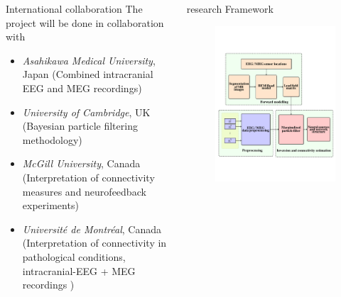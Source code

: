\documentclass[serif,final]{beamer}
\begin{document}
\begin{frame}{}
\begin{columns}[t]
\begin{column}{0.45\linewidth}
	\begin{block}{International collaboration}
        The project will be done in collaboration with 
        \begin{itemize}
    		    \small
        		\item \textit{Asahikawa Medical University}, Japan (Combined intracranial EEG and MEG recordings)
	        \item \textit{University of Cambridge}, UK (Bayesian particle filtering methodology)
    		    \item \textit{McGill University}, Canada (Interpretation of connectivity measures and neurofeedback experiments)
    		    \item  \textit{Universit\'e de Montr\'eal}, Canada (Interpretation of connectivity in pathological conditions, intracranial-EEG + MEG recordings )
        \end{itemize}      
    \end{block}
    \end{column}%

    \begin{column}{0.5\linewidth}

      \begin{block}{research Framework}     
 	  \begin{figure}
    		    \vspace{2cm}
       		 \centering    
	         \includegraphics[width = 0.4\linewidth]{framework_ver2}
        \end{figure}
       

\end{block}
\end{column}
\end{columns}
\end{frame}
\end{document}
